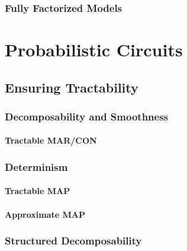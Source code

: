 			\subsubsection{Fully Factorized Models} %

	\section{Probabilistic Circuits} %

		\subsection{Ensuring Tractability} %

			\subsubsection{Decomposability and Smoothness} %

				\paragraph{Tractable MAR/CON} %

			\subsubsection{Determinism} %

				\paragraph{Tractable MAP} %

				\paragraph{Approximate MAP} %

			\subsubsection{Structured Decomposability} %

